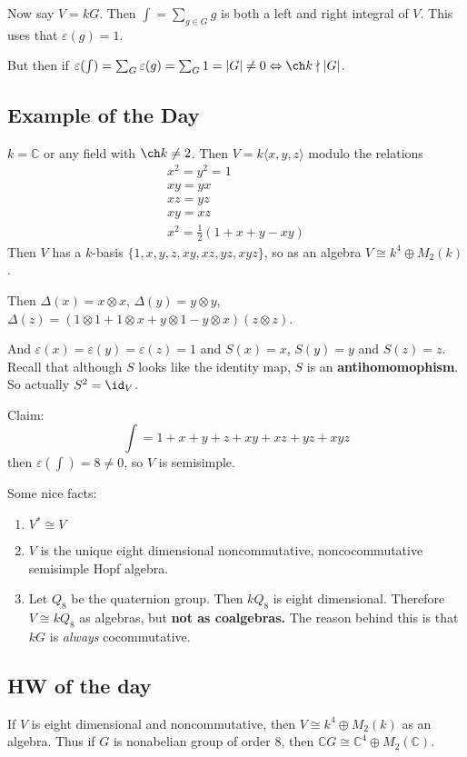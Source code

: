 \documentclass[12pt]{article}
\newcommand*{\C}{
\mathbb{C}
}
\begin{document}
Now say $V=kG$. Then $\int=\sum_{g\in G} g$ is both a left and right integral of $V$. This uses that $\varepsilon(g)=1$.

But then if $\varepsilon(\int)=\sum_G \varepsilon(g)=\sum_G 1=|G|\ne 0\Leftrightarrow \ch k\nmid |G|$.

\subsection{Example of the Day}
\begin{ex}
	$k=\C$ or any field with $\ch k\ne 2$. Then $V=k\langle x,y,z\rangle$ modulo the relations
	\begin{align*}
		x^2=y^2=1\\
		xy=yx\\
		xz=yz\\
		xy=xz\\
		x^2=\frac{1}{2}(1+x+y-xy)
	\end{align*}
	Then $V$ has a $k$-basis $\{1,x,y,z,xy,xz,yz,xyz\}$, so as an algebra $V\cong k^4\oplus M_2(k)$.

	Then $\Delta(x)=x\otimes x$, $\Delta(y)=y\otimes y$, $\Delta(z)=(1\otimes 1+1\otimes x+y\otimes 1-y\otimes x)(z\otimes z)$.

	And $\varepsilon(x)=\varepsilon(y)=\varepsilon(z)=1$ and $S(x)=x$, $S(y)=y$ and $S(z)=z$. Recall that although $S$ looks like the identity map, 
	$S$ is an \textbf{antihomomophism}. So actually $S^2=\id_V$.

	Claim:
	\[\int=1+x+y+z+xy+xz+yz+xyz\]
	then $\varepsilon(\int)=8\ne 0$, so $V$ is semisimple.

	Some nice facts:
	\begin{enumerate}
		\item $V^*\cong V$
		\item $V$ is the unique eight dimensional noncommutative, noncocommutative semisimple Hopf algebra.
		\item Let $Q_8$ be the quaternion group. Then $kQ_8$ is eight dimensional. Therefore $V\cong kQ_8$ as algebras, but \textbf{not as coalgebras.}
		The reason behind this is that $kG$ is \textit{always} cocommutative.
	\end{enumerate}
\end{ex}

\subsection{HW of the day}
\begin{prob}
	If $V$ is eight dimensional and noncommutative, then $V\cong k^4\oplus M_2(k)$ as an algebra. Thus if $G$ is nonabelian group of order 8, then $\C G\cong \C^4\oplus M_2(\C)$.
\end{prob}
\end{document}
